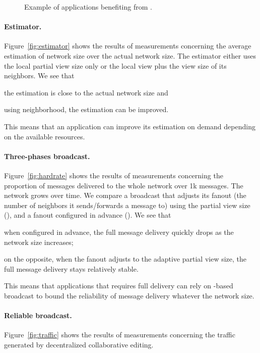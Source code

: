 \begin{figure}
\begin{center}
    \caption{Example of applications benefiting from \SPRAY.}
  \end{center}
\end{figure}

\paragraph{Estimator.} Figure~\ref{fig:estimator} shows the results of
measurements concerning the average estimation of network size over the actual
network size. The estimator either uses the local partial view size only or the
local view plus the view size of its neighbors. We see that
\begin{inparaenum}[(i)]
\item the estimation is close to the actual network size and
\item using neighborhood, the estimation can be improved.
\end{inparaenum}
This means that an application can improve its estimation on demand depending on
the available resources.

\paragraph{Three-phases broadcast.} Figure~\ref{fig:hardrate} shows the results
of measurements concerning the proportion of messages delivered to the whole
network over 1k messages. The network grows over time. We compare a broadcast
that adjusts its fanout (the number of neighbors it sends/forwards a message to)
using the partial view size (\SPRAY), and a fanout configured in advance
(\CYCLON). We see that
\begin{inparaenum}
\item when configured in advance, the full message delivery quickly drops as the
  network size increases; 
\item on the opposite, when the fanout adjusts to the adaptive partial view
  size, the full message delivery stays relatively stable.
\end{inparaenum}
This means that applications that requires full delivery can rely on
\SPRAY-based broadcast to bound the reliability of message delivery whatever the
network size.


\paragraph{Reliable broadcast.} Figure~\ref{fig:traffic} shows the results of
measurements concerning the traffic generated by decentralized collaborative
editing. 


